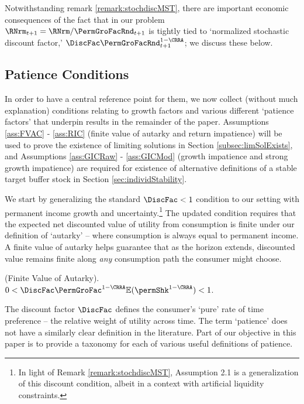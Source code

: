\documentclass[BufferStockTheory]{subfiles}
\begin{document}
Notwithstanding remark \ref{remark:stochdiscMST},  there are important economic consequences of the fact that in our problem $\RNrm_{t+1}=\RNrm/\PermGroFacRnd_{t+1}$ is tightly tied to `normalized stochastic discount factor,' $\DiscFac \PermGroFacRnd_{t+1}^{1-\CRRA}$; we discuss these below.

\hypertarget{GICTheorySetup}{}
\subsection{Patience Conditions}\label{subsec:GICTheorySetup}

In order to have a central reference point for them, we now collect (without much explanation) conditions relating to growth factors and various different `patience factors' that underpin results in the remainder of the paper. Assumptions \ref{ass:FVAC} - \ref{ass:RIC}  (finite value of autarky and return impatience) will be used to prove the existence of limiting solutions in Section \ref{subsec:limSolExists}, and Assumptions \ref{ass:GICRaw} - \ref{ass:GICMod} (growth impatience and strong growth impatience) are required for existence of alternative definitions of a stable target buffer stock in Section \ref{sec:individStability}. 

We start by generalizing the standard $\DiscFac<1$ condition to our setting with permanent income growth and uncertainty.\footnote{In light of Remark \ref{remark:stochdiscMST}, \cite{mstIncFluct} Assumption 2.1 is a generalization of this discount condition, albeit in a context with artificial liquidity constraints.} The updated condition requires that the expected net discounted value of utility from consumption is finite under our definition of `autarky' -- where consumption is always equal to permanent income. A finite value of autarky helps guarantee that as the horizon extends, discounted value remains finite along \textit{any} consumption path the consumer might choose.  


\hypertarget{FVAC}{}
\begin{assumL}\label{ass:FVAC}(Finite Value of Autarky). 
%
$0 < \DiscFac \PermGroFac^{1-\CRRA}\mathbb{E}(\permShk^{1-\CRRA}) < 1 $.
%
\end{assumL}

The discount factor $\DiscFac$ defines the consumer's `pure' rate of time preference -- the relative weight of utility across time.  The term `patience' does not have a similarly clear definition in the literature. Part of our objective in this paper is to provide a taxonomy for each of various useful definitions of patience.
\end{document}
